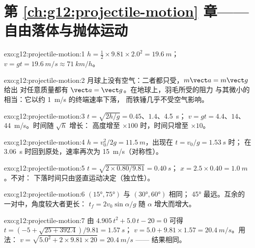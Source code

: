 \section*{第 \ref{ch:g12:projectile-motion} 章——自由落体与抛体运动}

\begin{solution}{exo:g12:projectile-motion:1}
$h = \tfrac12 \times 9.81 \times 2.0^2 = \qty{19.6}{m}$；
$v = gt = \qty{19.6}{m/s} \approx \qty{71}{km/h}$。
\end{solution}

\begin{solution}{exo:g12:projectile-motion:2}
月球上没有空气：二者都只受，$m\vect a = m\vect g$ 给出
对任意质量都有 $\vect a = \vect g$。在地球上，羽毛所受的阻力
与其微小的相当：它以约 \qty{1}{m/s} 的终端速率下落，
而铁锤几乎不受空气影响。
\end{solution}

\begin{solution}{exo:g12:projectile-motion:3}
$t = \sqrt{2h/g} = 0.45$、$1.4$、\qty{4.5}{s}；
$v = gt = 4.4$、$14$、\qty{44}{m/s}。时间随 $\sqrt h$ 增长：
高度增至 $\times 100$ 时，时间只增至 $\times 10$。
\end{solution}

\begin{solution}{exo:g12:projectile-motion:4}
$h = v_0^2/2g = \qty{11.5}{m}$，出现在 $t = v_0/g = \qty{1.53}{s}$ 时；
在 \qty{3.06}{s} 时回到原处，速率再次为 \qty{15}{m/s}（对称性）。
\end{solution}

\begin{solution}{exo:g12:projectile-motion:5}
$t = \sqrt{2 \times 0.80/9.81} = \qty{0.40}{s}$；
$x = 2.5 \times 0.40 = \qty{1.0}{m}$。不对：
下落时间只由竖直运动决定（独立性）。
\end{solution}

\begin{solution}{exo:g12:projectile-motion:6}
$(\ang{15},\ang{75})$ 与 $(\ang{30},\ang{60})$ 相同；
\ang{45} 最远。互余的一对中，角度较大者更长：
$t_f = 2v_0\sin\alpha/g$ 随 $\alpha$ 增大而增大。
\end{solution}

\begin{solution}{exo:g12:projectile-motion:7}
由 $4.905\,t^2 + 5.0\,t - 20 = 0$ 可得
$t = (-5 + \sqrt{25 + 392.4})/9.81 = \qty{1.57}{s}$；
$v = 5.0 + 9.81 \times 1.57 = \qty{20.4}{m/s}$。用法：
$v = \sqrt{5.0^2 + 2 \times 9.81 \times 20} = \qty{20.4}{m/s}$ ——
结果相同。
\end{solution}

